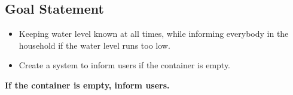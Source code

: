 \subsection{Goal Statement}

\begin{itemize}
    \item Keeping water level known at all times, while informing everybody in the household if the water level runs too low.
    \item Create a system to inform users if the container is empty. 
\end{itemize}

\textbf{If the container is empty, inform users.}
